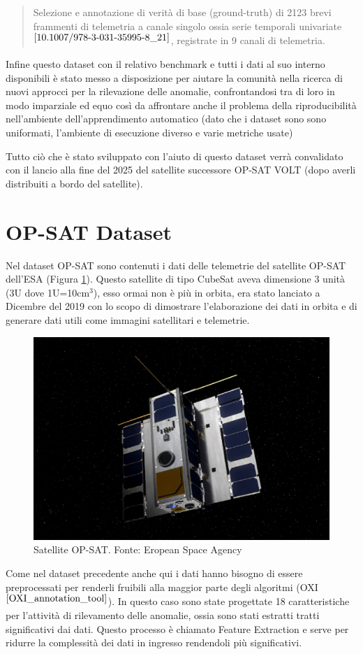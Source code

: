 \begin{quote}
    Selezione e annotazione di verità di base (ground-truth) di 2123 brevi frammenti di telemetria a canale singolo ossia serie temporali univariate$^{\cite{10.1007/978-3-031-35995-8_21}}$, registrate in 9 canali di telemetria.
\end{quote}

Infine questo dataset con il relativo benchmark e tutti i dati al suo interno disponibili è stato messo a disposizione per aiutare la comunità nella ricerca di nuovi approcci per la rilevazione delle anomalie, confrontandosi tra di loro in modo imparziale ed equo così da affrontare anche il problema della riproducibilità nell'ambiente dell'apprendimento automatico (dato che i dataset sono sono uniformati, l'ambiente di esecuzione diverso e varie metriche usate) 

Tutto ciò che è stato sviluppato con l'aiuto di questo dataset verrà convalidato con il lancio alla fine del 2025 del satellite successore OP-SAT VOLT (dopo averli distribuiti a bordo del satellite).


\section{OP-SAT Dataset}
Nel dataset OP-SAT sono contenuti i dati delle telemetrie del satellite OP-SAT dell'ESA (Figura \ref{fig:OP-SAT_satellite}). Questo satellite di tipo CubeSat aveva dimensione 3 unità (3U dove 1U=10cm$^3$), esso ormai non è più in orbita, era stato lanciato a Dicembre del 2019 con lo scopo di dimostrare l'elaborazione dei dati in orbita e di generare dati utili come immagini satellitari e telemetrie.

\begin{figure}[h]
    \centering
    \includegraphics[width=0.5\linewidth]{images/Capitolo2/OP-SAT_satellite.png}
    \caption{Satellite OP-SAT. Fonte: Eropean Space Agency}
    \label{fig:OP-SAT_satellite}
\end{figure}

Come nel dataset precedente anche qui i dati hanno bisogno di essere preprocessati per renderli fruibili alla maggior parte degli algoritmi (OXI$^{\cite{OXI_annotation_tool}}$). In questo caso sono state progettate 18 caratteristiche per l'attività di rilevamento delle anomalie, ossia sono stati estratti tratti significativi dai dati. Questo processo è chiamato Feature Extraction e serve per ridurre la complessità dei dati in ingresso rendendoli più significativi.

